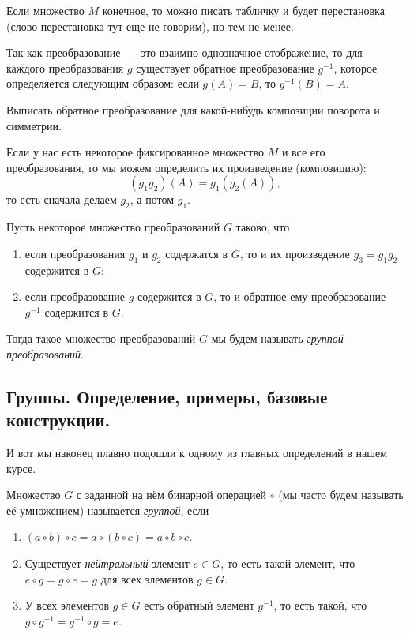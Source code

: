 	\begin{example}
		Если множество $M$ конечное, то можно писать табличку и будет перестановка (слово перестановка тут еще не говорим), но тем не менее. 
	\end{example}

	\begin{definition} 
		Так как преобразование~--- это взаимно однозначное отображение, то для каждого преобразования $g$ существует обратное преобразование $g^{-1}$, которое определяется следующим образом: если $g(A) = B$, то $g^{-1}(B) = A$.
	\end{definition}

	\begin{example}
		Выписать обратное преобразование для какой-нибудь композиции поворота и симметрии. 
	\end{example}

	Если у нас есть некоторое фиксированное множество $M$ и все его преобразования, то мы можем определить их произведение (композицию): 
	\[
		(g_1 g_2)(A) = g_1(g_2(A)),
	\]
	то есть сначала делаем $g_2$, а потом $g_1$. 

	\begin{definition} 
		Пусть некоторое множество преобразований $G$ таково, что 
		\begin{enumerate}
		 	\item если преобразования $g_1$ и $g_2$ содержатся в $G$, то и их произведение $g_3 = g_1g_2$ содержится в $G$;
		 	\item если преобразование $g$ содержится в $G$, то и обратное ему преобразование $g^{-1}$ содержится в $G$.
		 \end{enumerate}
		 Тогда такое множество преобразований $G$ мы будем называть \emph{группой преобразований}.
	\end{definition}

	\subsection{Группы. Определение, примеры, базовые конструкции.}

	И вот мы наконец плавно подошли к одному из главных определений в нашем курсе. 

	\begin{definition} 
		Множество $G$ с заданной на нём бинарной операцией $\circ$ (мы часто будем называть её умножением) называется \emph{группой}, если 
		\begin{enumerate}
			\item $(a \circ b) \circ c = a \circ (b \circ c) = a \circ b \circ c$. 
			\item Существует \emph{нейтральный} элемент $e \in G$, то есть такой элемент, что $e \circ g = g \circ e = g$ для всех элементов $g \in G$. 
			\item У всех элементов $g \in G$ есть обратный элемент $g^{-1}$, то есть такой, что $g \circ g^{-1} = g^{-1} \circ g = e$.
		\end{enumerate}
	\end{definition}

